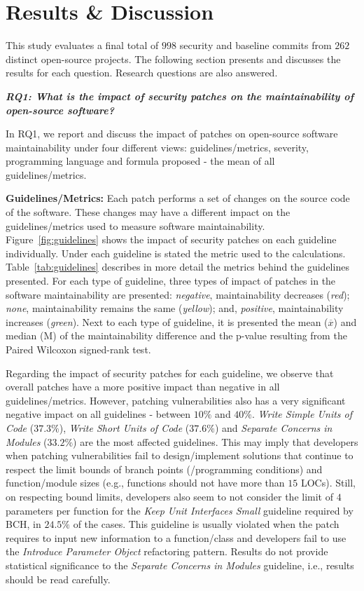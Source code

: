 \documentclass[10pt,conference]{IEEEtran}
\begin{document}
\section{Results \& Discussion}\label{sec:results}

This study evaluates a final total of $998$ security and baseline commits 
from $262$ distinct open-source projects. The following section presents and 
discusses the results for each question. Research questions are also answered.

\textit{\textbf{RQ1: What is the impact of security patches on the
maintainability of open-source software?}}

In RQ1, we report and discuss the impact of patches on open-source
software maintainability under four different views: guidelines/metrics, 
severity, programming language and formula proposed - the mean of all 
guidelines/metrics.

\textbf{Guidelines/Metrics:} Each patch performs a set of changes
on the source code of the software. These changes may have a different
impact on the guidelines/metrics used to measure software maintainability. 
Figure~\ref{fig:guidelines} shows the impact of security patches 
on each guideline individually. Under each guideline is stated the 
metric used to the calculations. Table~\ref{tab:guidelines} describes 
in more detail the metrics behind the guidelines presented. 
For each type of guideline, three types of impact of patches in 
the software maintainability are presented: 
\emph{negative}, maintainability decreases (\emph{red});
\emph{none}, maintainability remains the same (\emph{yellow}); and,
\emph{positive}, maintainability increases (\emph{green}). Next to each
type of guideline, it is presented the mean ($\overline{x}$) and median (M)
of the maintainability difference and the p-value resulting from the
Paired Wilcoxon signed-rank test.

Regarding the impact of security patches for each guideline, we observe
that overall patches have a more positive impact than negative in
all guidelines/metrics. However, patching vulnerabilities also has a very
significant negative impact on all guidelines - between $10\%$ and $40\%$. 
\emph{Write Simple Units of Code} ($37.3\%$), \emph{Write Short Units of 
Code} ($37.6\%$) and \emph{Separate Concerns in Modules} ($33.2\%$) are the 
most affected guidelines. This may imply that developers when patching 
vulnerabilities fail to design/implement solutions that continue to respect 
the limit bounds of branch points (/programming conditions) and function/module 
sizes (e.g., functions should not have more than $15$ LOCs). Still, on 
respecting bound limits, developers also seem to not consider the limit 
of $4$ parameters per function for the \emph{Keep Unit Interfaces Small} 
guideline required by BCH, in $24.5\%$ of the cases. This guideline is usually
violated when the patch requires to input new information to a function/class 
and developers fail to use the \emph{Introduce Parameter Object} refactoring 
pattern. Results do not provide statistical significance to the \emph{Separate 
Concerns in Modules} guideline, i.e., results should be read carefully. 
\end{document}
